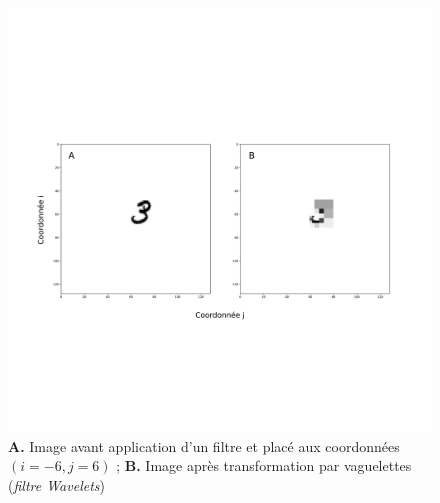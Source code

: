 \begin{figure}[th]
\centering
\includegraphics[scale=0.3]{Figures/wavelet_effect}
\decoRule %
\caption[Figure]{\textbf{A.} Image avant application d'un filtre et placé aux coordonnées $(i=-6,j=6)$ ; \textbf{B.} Image après transformation par vaguelettes (\textit{filtre Wavelets})}
\label{fig:wavelet_effect}
\end{figure}

